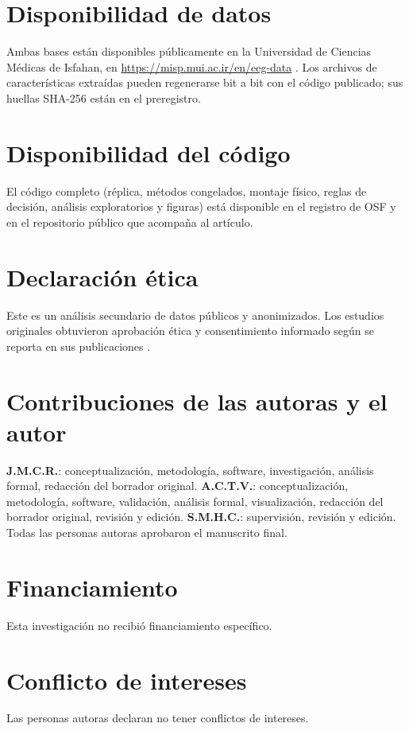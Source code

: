 \documentclass[11pt,letterpaper]{article}
\begin{document}
\section*{Disponibilidad de datos}
Ambas bases están disponibles públicamente en la Universidad de Ciencias Médicas de Isfahan, en \url{https://misp.mui.ac.ir/en/eeg-data} \citep{kashefpoor2016,kashefpoor2019}. Los archivos de características extraídas pueden regenerarse bit a bit con el código publicado; sus huellas SHA-256 están en el preregistro.

\section*{Disponibilidad del código}
El código completo (réplica, métodos congelados, montaje físico, reglas de decisión, análisis exploratorios y figuras) está disponible en el registro de OSF y en el repositorio público que acompaña al artículo.

\section*{Declaración ética}
Este es un análisis secundario de datos públicos y anonimizados. Los estudios originales obtuvieron aprobación ética y consentimiento informado según se reporta en sus publicaciones \citep{kashefpoor2016,kashefpoor2019}.

\section*{Contribuciones de las autoras y el autor}
\textbf{J.M.C.R.}: conceptualización, metodología, software, investigación, análisis formal, redacción del borrador original. \textbf{A.C.T.V.}: conceptualización, metodología, software, validación, análisis formal, visualización, redacción del borrador original, revisión y edición. \textbf{S.M.H.C.}: supervisión, revisión y edición. Todas las personas autoras aprobaron el manuscrito final.

\section*{Financiamiento}
Esta investigación no recibió financiamiento específico.

\section*{Conflicto de intereses}
Las personas autoras declaran no tener conflictos de intereses.



\end{document}
